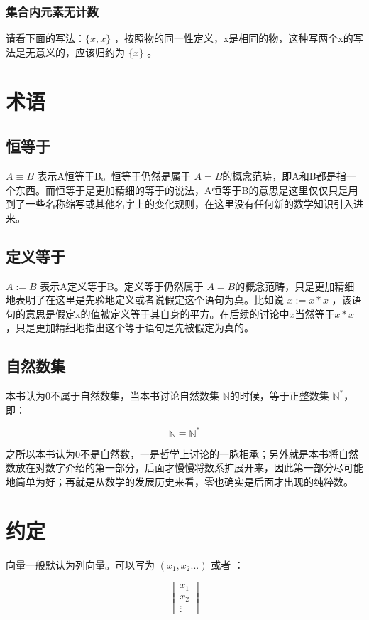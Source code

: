 \documentclass[12pt,oneside]{book}
\begin{document}
\subsection{集合内元素无计数}
请看下面的写法：$\{x, x\}$ ，按照物的同一性定义，x是相同的物，这种写两个x的写法是无意义的，应该归约为 $\{x\}$ 。




\chapter{术语}
\section{恒等于}
$A \equiv B$ 表示A恒等于B。恒等于仍然是属于 $A=B$的概念范畴，即A和B都是指一个东西。而恒等于是更加精细的等于的说法，A恒等于B的意思是这里仅仅只是用到了一些名称缩写或其他名字上的变化规则，在这里没有任何新的数学知识引入进来。

\section{定义等于}
$A := B$ 表示A定义等于B。定义等于仍然属于 $A=B$的概念范畴，只是更加精细地表明了在这里是先验地定义或者说假定这个语句为真。比如说 $x := x*x$ ，该语句的意思是假定x的值被定义等于其自身的平方。在后续的讨论中$x$当然等于$x*x$，只是更加精细地指出这个等于语句是先被假定为真的。





\section{自然数集}
本书认为0不属于自然数集，当本书讨论自然数集 $ \mathbb{N} $的时候，等于正整数集 $\mathbb{N}^{*}$，即：

\[
\mathbb{N} \equiv \mathbb{N}^{*}
\]

之所以本书认为0不是自然数，一是哲学上讨论的一脉相承；另外就是本书将自然数放在对数字介绍的第一部分，后面才慢慢将数系扩展开来，因此第一部分尽可能地简单为好；再就是从数学的发展历史来看，零也确实是后面才出现的纯粹数。

\chapter{约定}
向量一般默认为列向量。可以写为 $(x_1, x_2...)$ 或者 ：

\[
\begin{bmatrix}x_{1}  \\ x_2 \\ \vdots \end{bmatrix}
\]
\end{document}
